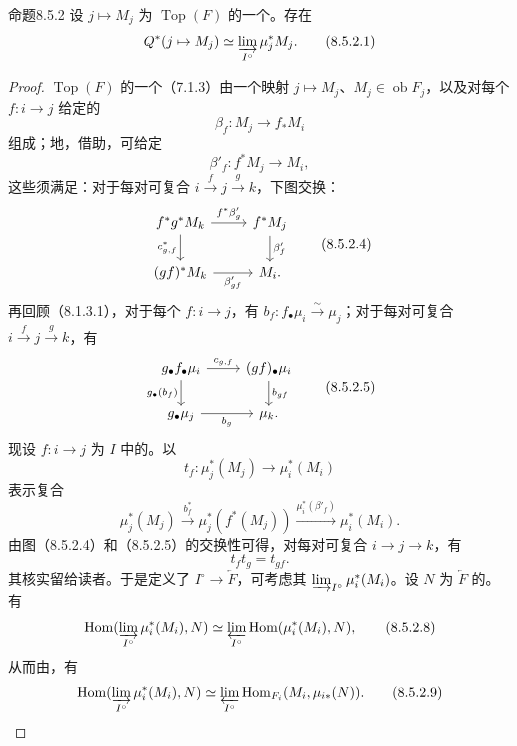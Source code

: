 \begin{SGAresult}{命题}{8.5.2}
设 $j\mapsto M_j$ 为 $\operatorname{Top}(F)$ 的一个。存在
\[
 Q^*(j\mapsto M_j)\simeq\varinjlim_{I^\circ}\mu_j^*M_j.\tag{8.5.2.1}
\]
\end{SGAresult}
\begin{proof}
$\operatorname{Top}(F)$ 的一个（7.1.3）由一个映射 $j\mapsto M_j$、$M_j\in\operatorname{ob}F_j$，以及对每个 $f:i\to j$ 给定的
\[
 \beta_f:M_j\longrightarrow f_*M_i\tag{8.5.2.2}
\]
组成；地，借助，可给定
\[
 \beta'_f:f^*M_j\longrightarrow M_i,\tag{8.5.2.3}
\]
这些须满足：对于每对可复合 $i\xrightarrow f j\xrightarrow g k$，下图交换：
\[
\begin{tikzcd}
f^*g^*M_k\arrow[r,"f^*\beta'_g"]\arrow[d,"{c^*_{g,f}}"']&f^*M_j\arrow[d,"\beta'_f"]\\
(gf)^*M_k\arrow[r,"\beta'_{gf}"']&M_i.
\end{tikzcd}\tag{8.5.2.4}
\]
再回顾（8.1.3.1），对于每个 $f:i\to j$，有 $b_f:f_\bullet\mu_i\xrightarrow\sim\mu_j$；对于每对可复合 $i\xrightarrow f j\xrightarrow g k$，有
\[
\begin{tikzcd}
g_\bullet f_\bullet\mu_i\arrow[r,"{c_{g,f}}"]\arrow[d,"g_\bullet(b_f)"']&(gf)_\bullet\mu_i\arrow[d,"b_{gf}"]\\
g_\bullet\mu_j\arrow[r,"b_g"']&\mu_k.
\end{tikzcd}\tag{8.5.2.5}
\]
现设 $f:i\to j$ 为 $I$ 中的。以
\[
 t_f:\mu_j^*(M_j)\longrightarrow\mu_i^*(M_i)\tag{8.5.2.6}
\]
表示复合
\[
 \mu_j^*(M_j)\xrightarrow{b_f^*}\mu_j^*(f^*(M_j))
 \xrightarrow{\mu_i^*(\beta'_f)}\mu_i^*(M_i).
\]
由图（8.5.2.4）和（8.5.2.5）的交换性可得，对每对可复合 $i\to j\to k$，有
\[
 t_ft_g=t_{gf}.\tag{8.5.2.7}
\]
其核实留给读者。于是定义了 $I^\circ\to\underleftarrow F$，可考虑其 $\varinjlim_{I^\circ}\mu_i^*(M_i)$。设 $N$ 为 $\underleftarrow F$ 的。有
\[
 \operatorname{Hom}(\varinjlim_{I^\circ}\mu_i^*(M_i),N)
 \simeq\varprojlim_{I^\circ}\operatorname{Hom}(\mu_i^*(M_i),N),\tag{8.5.2.8}
\]
从而由，有
\[
 \operatorname{Hom}(\varinjlim_{I^\circ}\mu_i^*(M_i),N)
 \simeq\varprojlim_{I^\circ}\operatorname{Hom}_{F_i}(M_i,\mu_{i*}(N)).\tag{8.5.2.9}
\]
\end{proof}
